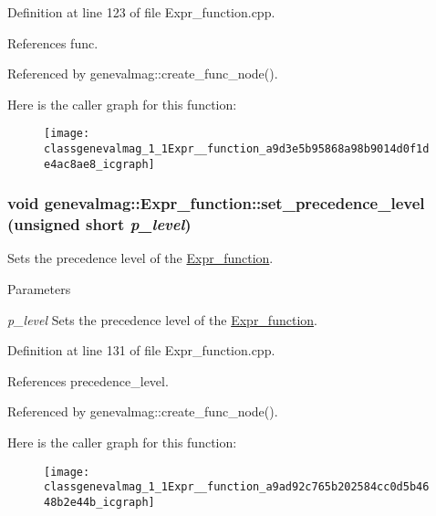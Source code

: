 Definition at line 123 of file Expr\_\-function.cpp.



References func.



Referenced by genevalmag::create\_\-func\_\-node().



Here is the caller graph for this function:\nopagebreak
\begin{figure}[H]
\begin{center}
\leavevmode
\texttt{[image: classgenevalmag\_1\_1Expr\_\_function\_a9d3e5b95868a98b9014d0f1de4ac8ae8\_icgraph]}
\end{center}
\end{figure}


\hypertarget{classgenevalmag_1_1Expr__function_a9ad92c765b202584cc0d5b4648b2e44b}{
\subsubsection[{set\_\-precedence\_\-level}]{\setlength{\rightskip}{0pt plus 5cm}void genevalmag::Expr\_\-function::set\_\-precedence\_\-level (unsigned short {\em p\_\-level})}}
\label{classgenevalmag_1_1Expr__function_a9ad92c765b202584cc0d5b4648b2e44b}
Sets the precedence level of the \hyperlink{classgenevalmag_1_1Expr__function}{Expr\_\-function}. 
\begin{DoxyParams}{Parameters}
\item[{\em p\_\-level}]Sets the precedence level of the \hyperlink{classgenevalmag_1_1Expr__function}{Expr\_\-function}. \end{DoxyParams}


Definition at line 131 of file Expr\_\-function.cpp.



References precedence\_\-level.



Referenced by genevalmag::create\_\-func\_\-node().



Here is the caller graph for this function:\nopagebreak
\begin{figure}[H]
\begin{center}
\leavevmode
\texttt{[image: classgenevalmag\_1\_1Expr\_\_function\_a9ad92c765b202584cc0d5b4648b2e44b\_icgraph]}
\end{center}
\end{figure}


